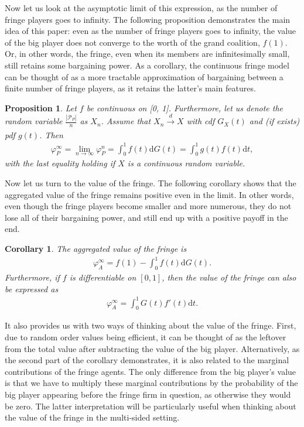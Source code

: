 \documentclass[a4paper]{article}
\newtheorem{proposition}{Proposition}
\newtheorem{corollary}{Corollary}
\newcommand{\dt}{\mathrm{d}t}
\newcommand{\dG}{\mathrm{d}G}
\begin{document}
Now let us look at the asymptotic limit of this expression, as the number of fringe players goes to infinity.
The following proposition demonstrates the main idea of this paper: even as the number of fringe players goes to infinity, the value of the big player does not converge to the worth of the grand coalition, $f(1)$.
Or, in other words, the fringe, even when its members are infinitesimally small, still retains some bargaining power.
As a corollary, the continuous fringe model can be thought of as a more tractable approximation of bargaining between a finite number of fringe players, as it retains the latter's main features.

\begin{proposition}
    \label{prop:one_sided_general}
    Let $f$ be continuous on [0, 1]. Furthermore, let us denote the random variable $\frac{|\mathcal{P}_P|}{n}$ as $X_n$. Assume that $X_n \xrightarrow[]{d} X$ with cdf $G_X(t)$ and (if exists) pdf $g(t)$.
    Then
    \begin{align*}
        \varphi_P^\infty = \lim_{n \to \infty} \varphi_P^n = \int_0^1 f(t) \dG(t) = \int_0^1 g(t) f(t) \dt,
    \end{align*}
    with the last equality holding if $X$ is a continuous random variable.
\end{proposition}

Now let us turn to the value of the fringe.
The following corollary shows that the aggregated value of the fringe remains positive even in the limit.
In other words, even though the fringe players become smaller and more numerous, they do not lose all of their bargaining power, and still end up with a positive payoff in the end.
\begin{corollary}
    \label{cor:fringe_value_general}
    The aggregated value of the fringe is
    \begin{align*}
        \varphi_A^\infty = f(1) - \int_0^1 f(t) \dG(t).
    \end{align*}
    Furthermore, if $f$ is differentiable on $[0, 1]$, then the value of the fringe can also be expressed as
    \begin{align*}
        \varphi_A^\infty = \int_0^1 G(t) f'(t) \dt.
    \end{align*}
\end{corollary}

It also provides us with two ways of thinking about the value of the fringe.
First, due to random order values being efficient, it can be thought of as the leftover from the total value after subtracting the value of the big player.
Alternatively, as the second part of the corollary demonstrates, it is also related to the marginal contributions of the fringe agents.
The only difference from the big player's value is that we have to multiply these marginal contributions by the probability of the big player appearing before the fringe firm in question, as otherwise they would be zero.
The latter interpretation will be particularly useful when thinking about the value of the fringe in the multi-sided setting.
\end{document}
